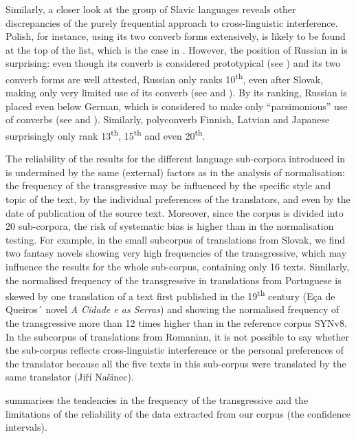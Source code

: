 \documentclass[output=paper,russian]{langsci/langscibook}
\begin{document}
Similarly, a closer look at the group of Slavic languages reveals other discrepancies of the purely frequential approach to cross-linguistic interference. Polish, for instance, using its two converb forms extensively, is likely to be found at the top of the list, which is the case in . However, the position of Russian in  is surprising: even though its converb is considered prototypical (see ) and its two converb forms are well attested, Russian only ranks 10\textsuperscript{th}, even after Slovak, making only very limited use of its converb (see  and \textcite[25]{brtkova04}). By its ranking, Russian is placed even below German, which is considered to make only \enquote{parsimonious} use of converbs (see  and \textcite[72]{koenig95}). Similarly, polyconverb Finnish, Latvian and Japanese surprisingly only rank 13\textsuperscript{th}, 15\textsuperscript{th} and even 20\textsuperscript{th}.

The reliability of the results for the different language sub-corpora introduced in  is undermined by the same (external) factors as in the analysis of normalisation: the frequency of the transgressive may be influenced by the specific style and topic of the text, by the individual preferences of the translators, and even by the date of publication of the source text. Moreover, since the corpus is divided into 20 sub-corpora, the risk of systematic bias is higher than in the normalisation testing. For example, in the small subcorpus of translations from Slovak, we find two fantasy novels showing very high frequencies of the transgressive, which may influence the results for the whole sub-corpus, containing only 16 texts. Similarly, the normalised frequency of the transgressive in translations from Portuguese is skewed by one translation of a text first published in the 19\textsuperscript{th} century (Eça de Queiros´ novel \textit{A Cidade e as Serras}) and showing the normalised frequency of the transgressive more than 12 times higher than in the reference corpus SYNv8. In the subcorpus of translations from Romanian, it is not possible to say whether the sub-corpus reflects cross-linguistic interference or the personal preferences of the translator because all the five texts in this sub-corpus were translated by the same translator (Jiří Našinec).

 summarises the tendencies in the frequency of the transgressive and the limitations of the reliability of the data extracted from our corpus (the confidence intervals).
\end{document}
